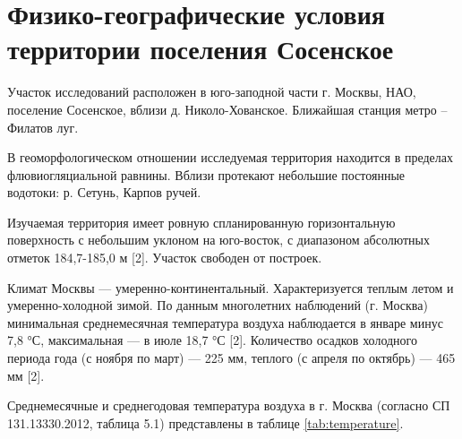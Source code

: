 \chapter*{Физико-географические условия территории поселения Сосенское}
 
Участок исследований расположен в юго-заподной части г. Москвы, НАО, поселение Сосенское, 
вблизи д. Николо-Хованское. Ближайшая станция метро – Филатов луг.

В геоморфологическом отношении исследуемая территория находится в пределах флювиогляциальной равнины. 
Вблизи протекают небольшие постоянные водотоки: р. Сетунь, Карпов ручей.

Изучаемая территория имеет ровную спланированную горизонтальную поверхность с небольшим уклоном на юго-восток, 
с диапазоном абсолютных отметок 184,7-185,0 м [2]. Участок свободен от построек.

Климат Москвы — умеренно-континентальный. 
Характеризуется теплым летом и умеренно-холодной зимой.
По данным многолетних наблюдений (г. Москва) минимальная среднемесячная температура воздуха наблюдается в январе минус 7,8 °С, максимальная — в июле 18,7 °С [2]. 
Количество осадков холодного периода года (с ноября по март) — 225 мм, теплого (с апреля по октябрь) — 465 мм [2]. 

Среднемесячные и среднегодовая температура воздуха в г. Москва (согласно СП 131.13330.2012, таблица 5.1) 
представлены в таблице \ref{tab:temperature}.


